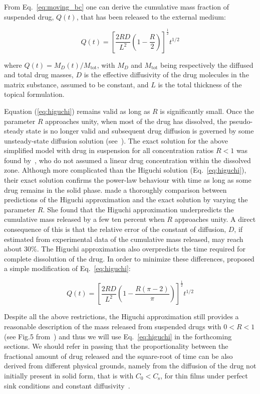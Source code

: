 \documentclass[superbib,unsortedaddress,preprint,byrevtex,aps,noshowpacs,titlepage]{revtex4}
\def\Co{C_0}
\def\Cs{C_\text{s}}
\begin{document}
From Eq.~\ref{eq:moving_bc} one can derive the cumulative mass fraction of suspended drug, 
$Q(t)$, that has been released to the external medium:

\begin{equation}
  \label{eq:higuchi}
  Q(t) = \left[\frac{2RD}{L^2}\left(1-\frac{R}{2}\right)\right]^\frac{1}{2} t^{1/2}
\end{equation}

where $Q(t) = M_D(t)/M_\text{tot}$, with $M_D$ and $M_\text{tot}$ being respectively the diffused 
and total drug masses, $D$ is the effective diffusivity of the drug molecules in the matrix substance,
 assumed to be constant, and $L$ is the total thickness of the topical formulation.

Equation (\ref{eq:higuchi}) remains valid as long as $R$ is significantly small. 
Once the parameter $R$ approaches unity, when most of the drug has dissolved, the
pseudo-steady state is no longer valid and subsequent drug diffusion is governed by some 
unsteady-state diffusion solution (see~\cite{Bunge1998}).
The exact solution for the above simplified model with drug in suspension for all concentration
 ratios $R<1$ was found by~\textcite{Paul1976}, who do not assumed a linear drug concentration 
within the dissolved zone.
Although more complicated than the Higuchi solution (Eq.~\ref{eq:higuchi}), their exact solution confirms 
the power-law behaviour with time as long as some drug remains in the solid phase.
\textcite{Bunge1998} made a thoroughly comparison between predictions of the Higuchi approximation and the
exact solution by varying the parameter $R$. 
She found that the Higuchi approximation underpredicts the cumulative mass released by a few ten percent 
when $R$ approaches unity.
A direct consequence of this is that the relative error of the constant of diffusion, $D$, if estimated
from experimental data of the cumulative mass released, may reach about $30\text{\%}$.
The Higuchi approximation also overpredicts the time required for complete dissolution of the drug.
In order to minimize these differences, \textcite{Bunge1998} proposed a simple modification of 
Eq.~\ref{eq:higuchi}:

\begin{equation}
  \label{eq:higuchi_mod}
  Q(t) = \left[\frac{2RD}{L^2}\left(1-\frac{R(\pi-2)}{\pi}\right)\right]^\frac{1}{2} t^{1/2}
\end{equation}

Despite all the above restrictions, the Higuchi approximation still provides a reasonable 
description of the mass released from suspended drugs with $0 < R < 1$ (see Fig.5 from~\textcite{Bunge1998})
and thus we will use Eq.~\ref{eq:higuchi} in the forthcoming sections.
We should refer in passing that the proportionality between the fractional amount of drug released
and the square-root of time can be also derived from different physical grounds, namely from the
diffusion of the drug not initially present in solid form, that is with $\Co < \Cs$, for thin films 
under perfect sink conditions and constant diffusivity~\cite{Crank1975}.  
\end{document}
